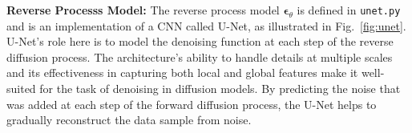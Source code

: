 \documentclass[11pt,addpoints,answers]{exam}
\begin{document}
\begin{questions}
    




    \textbf{Reverse Processs Model:} The reverse process model $\boldsymbol{\epsilon}_\theta$ is defined in \lstinline{unet.py} and is an implementation of a CNN called U-Net, as illustrated in Fig.~\ref{fig:unet}. 
    U-Net's role here is to model the denoising function at each step of the reverse diffusion process. The architecture's ability to handle details at multiple scales and its effectiveness in capturing both local and global features make it well-suited for the task of denoising in diffusion models. By predicting the noise that was added at each step of the forward diffusion process, the U-Net helps to gradually reconstruct the data sample from noise.
    

\end{questions}
\end{document}
